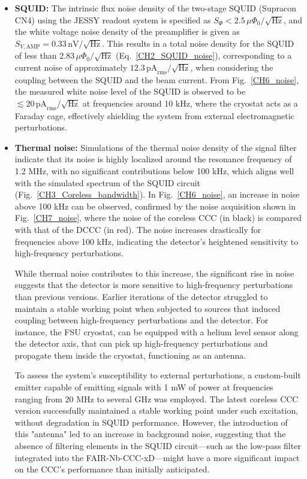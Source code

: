 \documentclass[12pt,a4paper]{report}
\begin{document}
        \begin{itemize}
        	\item \textbf{SQUID:} The intrinsic flux noise density of the two-stage SQUID (Supracon CN4) using the JESSY readout system is specified as $S_\Phi < 2.5 \, \mu\Phi_0/\sqrt{\text{Hz}}$, and the white voltage noise density of the preamplifier is given as $S_{V,\text{AMP}} = 0.33 \, \text{nV}/\sqrt{\text{Hz}}$. This results in a total noise density for the SQUID of less than $2.83 \, \mu\Phi_0/\sqrt{\text{Hz}}$ (Eq.~\ref{CH2_SQUID_noise}), corresponding to a current noise of approximately $12.3 \, \text{pA}_{\text{rms}}/\sqrt{\text{Hz}}$, when considering the coupling between the SQUID and the beam current. From Fig.~\ref{CH6_noise}, the measured white noise level of the SQUID is observed to be $\lesssim 20 \, \text{pA}_{\text{rms}}/\sqrt{\text{Hz}}$ at frequencies around 10 kHz, where the cryostat acts as a Faraday cage, effectively shielding the system from external electromagnetic perturbations.
        	
        	\item \textbf{Thermal noise:} Simulations of the thermal noise density of the signal filter \cite{DavidThesis} indicate that its noise is highly localized around the resonance frequency of 1.2 MHz, with no significant contributions below 100 kHz, which aligns well with the simulated spectrum of the SQUID circuit (Fig.~\ref{CH3_Coreless_bandwidth}). In Fig.~\ref{CH6_noise}, an increase in noise above 100 kHz can be observed, confirmed by the noise acquisition shown in Fig.~\ref{CH7_noise}, where the noise of the coreless CCC (in black) is compared with that of the DCCC (in red). The noise increases drastically for frequencies above 100 kHz, indicating the detector's heightened sensitivity to high-frequency perturbations.
        	
        	While thermal noise contributes to this increase, the significant rise in noise suggests that the detector is more sensitive to high-frequency perturbations than previous versions. Earlier iterations of the detector struggled to maintain a stable working point when subjected to sources that induced coupling between high-frequency perturbations and the detector. For instance, the FSU cryostat, can be equipped with a helium level sensor along the detector axis, that can pick up high-frequency perturbations and propagate them inside the cryostat, functioning as an antenna.

        	To assess the system's susceptibility to external perturbations, a custom-built emitter capable of emitting signals with 1 mW of power at frequencies ranging from 20 MHz to several GHz was employed. The latest coreless CCC version successfully maintained a stable working point under such excitation, without degradation in SQUID performance. However, the introduction of this "antenna" led to an increase in background noise, suggesting that the absence of filtering elements in the SQUID circuit—such as the low-pass filter integrated into the FAIR-Nb-CCC-xD—might have a more significant impact on the CCC's performance than initially anticipated. 
        	

\end{itemize}
\end{document}
